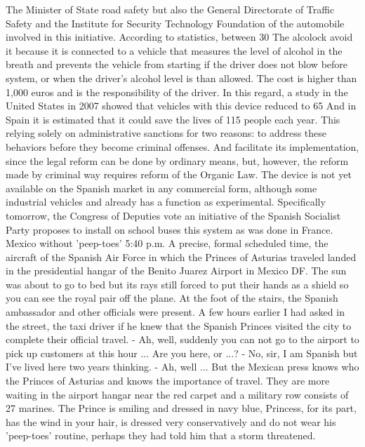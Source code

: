 The Minister of State road safety but also the General Directorate of Traffic Safety and the Institute for Security Technology Foundation of the automobile involved in this initiative.
According to statistics, between 30%
The alcolock avoid it because it is connected to a vehicle that measures the level of alcohol in the breath and prevents the vehicle from starting if the driver does not blow before system, or when the driver's alcohol level is than allowed.
The cost is higher than 1,000 euros and is the responsibility of the driver.
In this regard, a study in the United States in 2007 showed that vehicles with this device reduced to 65%
And in Spain it is estimated that it could save the lives of 115 people each year.
This relying solely on administrative sanctions for two reasons: to address these behaviors before they become criminal offenses.
And facilitate its implementation, since the legal reform can be done by ordinary means, but, however, the reform made by criminal way requires reform of the Organic Law.
The device is not yet available on the Spanish market in any commercial form, although some industrial vehicles and already has a function as experimental.
Specifically tomorrow, the Congress of Deputies vote an initiative of the Spanish Socialist Party proposes to install on school buses this system as was done in France.
Mexico without 'peep-toes'
5:40 p.m. A precise, formal scheduled time, the aircraft of the Spanish Air Force in which the Princes of Asturias traveled landed in the presidential hangar of the Benito Juarez Airport in Mexico DF.
The sun was about to go to bed but its rays still forced to put their hands as a shield so you can see the royal pair off the plane.
At the foot of the stairs, the Spanish ambassador and other officials were present.
A few hours earlier I had asked in the street, the taxi driver if he knew that the Spanish Princes visited the city to complete their official travel.
- Ah, well, suddenly you can not go to the airport to pick up customers at this hour ... Are you here, or ...?
- No, sir, I am Spanish but I've lived here two years thinking.
- Ah, well ...
But the Mexican press knows who the Princes of Asturias and knows the importance of travel.
They are more waiting in the airport hangar near the red carpet and a military row consists of 27 marines.
The Prince is smiling and dressed in navy blue, Princess, for its part, has the wind in your hair, is dressed very conservatively and do not wear his 'peep-toes' routine, perhaps they had told him that a storm threatened.
